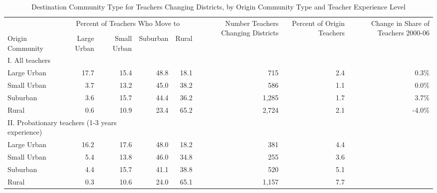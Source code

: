 \documentclass[12pt,]{article}
\begin{document}
\begin{sidewaystable}[htbp]
\centering
\begin{tabular}{lrrrrrrr}
  \hline
 & \multicolumn{4}{c}{\multirow{2}{*}{Percent of Teachers Who Move to}} & \multirow{4}{*}{\parbox{0.09\linewidth}{Number Teachers Changing Districts}} & \multirow{4}{*}{\parbox{0.07\linewidth}{Percent of Origin Teachers}} & \multirow{4}{*}{\parbox{0.07\linewidth}{Change in Share of Teachers 2000-06}}\\
 & \multicolumn{4}{c}{} & & & \\ \cline{2-5}
& & & & & & & \\
Origin Community & Large Urban & Small Urban & Suburban & Rural &  &  &  \\ 
  \hline
I. All teachers & & & & & & & \\
\quad Large Urban & 17.7 & 15.4 & 48.8 & 18.1 & 715 & 2.4 & 0.3\% \\ 
  \quad Small Urban & 3.7 & 13.2 & 45.0 & 38.2 & 586 & 1.1 & 0.0\% \\ 
  \quad Suburban & 3.6 & 15.7 & 44.4 & 36.2 & 1,285 & 1.7 & 3.7\% \\ 
  \quad Rural & 0.6 & 10.9 & 23.4 & 65.2 & 2,724 & 2.1 & -4.0\% \\ 
\multicolumn{3}{l}{II. Probationary teachers (1-3 years experience)} & & & & & \\
  \quad Large Urban & 16.2 & 17.6 & 48.0 & 18.2 & 381 & 4.4 &  \\ 
  \quad Small Urban & 5.4 & 13.8 & 46.0 & 34.8 & 255 & 3.6 &  \\ 
  \quad Suburban & 4.4 & 15.7 & 41.1 & 38.8 & 520 & 5.1 &  \\ 
  \quad Rural & 0.3 & 10.6 & 24.0 & 65.1 & 1,157 & 7.7 &  \\ 
   \hline
\end{tabular}
\caption{Destination Community Type for Teachers Changing Districts, by Origin Community Type and Teacher Experience Level} 
\label{tbl:markov}
\end{sidewaystable}
\end{document}

